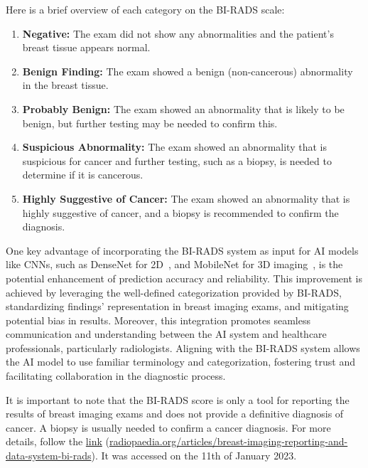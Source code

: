 \vspace{2.50mm}

\noindent
Here is a brief overview of each category on the \ac{BI-RADS} scale:

\vspace{1.50mm}

\begin{enumerate}
\item {\bf Negative:} The exam did not show any abnormalities and the patient's breast tissue appears normal.
\item {\bf Benign Finding:} The exam showed a benign (non-cancerous) abnormality in the breast tissue.
\item {\bf Probably Benign:} The exam showed an abnormality that is likely to be benign, but further testing may be needed to confirm this.
\item {\bf Suspicious Abnormality:} The exam showed an abnormality that is suspicious for cancer and further testing, such as a biopsy, is needed to determine if it is cancerous.
\item {\bf Highly Suggestive of Cancer:} The exam showed an abnormality that is highly suggestive of cancer, and a biopsy is recommended to confirm the diagnosis.
\end{enumerate}

\vspace{2.5mm}

\textcolor{revised}{One key advantage of incorporating the \ac{BI-RADS} system as input for \ac{AI} models like \acp{CNN}, such as DenseNet for 2D~\cite{CALISTO2022102285}, and MobileNet for 3D imaging~\cite{10230448}, is the potential enhancement of prediction accuracy and reliability.
This improvement is achieved by leveraging the well-defined categorization provided by \ac{BI-RADS}, standardizing findings' representation in breast imaging exams, and mitigating potential bias in results.
Moreover, this integration promotes seamless communication and understanding between the \ac{AI} system and healthcare professionals, particularly radiologists.
Aligning with the \ac{BI-RADS} system allows the \ac{AI} model to use familiar terminology and categorization, fostering trust and facilitating collaboration in the diagnostic process.}

It is important to note that the \ac{BI-RADS} score is only a tool for reporting the results of breast imaging exams and does not provide a definitive diagnosis of cancer.
A biopsy is usually needed to confirm a cancer diagnosis.
For more details, follow the \href{https://radiopaedia.org/articles/breast-imaging-reporting-and-data-system-bi-rads}{link} (\href{https://radiopaedia.org/articles/breast-imaging-reporting-and-data-system-bi-rads}{radiopaedia.org/articles/breast-imaging-reporting-and-data-system-bi-rads}).
It was accessed on the 11th of January 2023.

